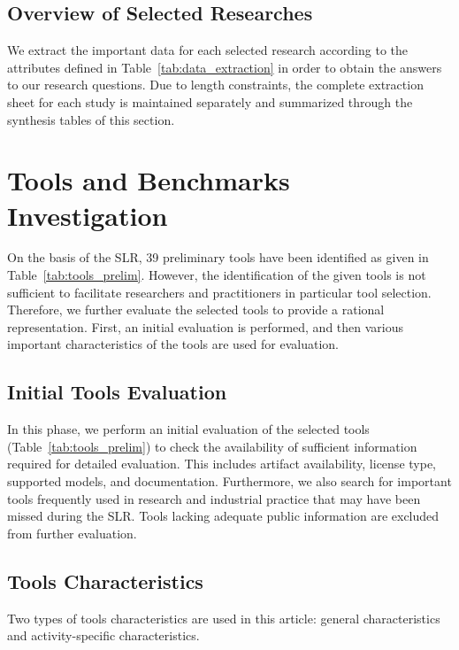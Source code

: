 \documentclass[10pt,a4paper]{article}
\begin{document}
\subsection{Overview of Selected Researches}
\label{sec:overview_researches}
We extract the important data for each selected research according to the attributes defined in Table~\ref{tab:data_extraction} in order to obtain the answers to our research questions. Due to length constraints, the complete extraction sheet for each study is maintained separately and summarized through the synthesis tables of this section.

\section{Tools and Benchmarks Investigation}
\label{sec:tools_investigation}
On the basis of the SLR, 39 preliminary tools have been identified as given in Table~\ref{tab:tools_prelim}. However, the identification of the given tools is not sufficient to facilitate researchers and practitioners in particular tool selection. Therefore, we further evaluate the selected tools to provide a rational representation. First, an initial evaluation is performed, and then various important characteristics of the tools are used for evaluation.

\subsection{Initial Tools Evaluation}
\label{sec:initial_eval}
In this phase, we perform an initial evaluation of the selected tools (Table~\ref{tab:tools_prelim}) to check the availability of sufficient information required for detailed evaluation. This includes artifact availability, license type, supported models, and documentation. Furthermore, we also search for important tools frequently used in research and industrial practice that may have been missed during the SLR. Tools lacking adequate public information are excluded from further evaluation.

\subsection{Tools Characteristics}
\label{sec:char_defined}
Two types of tools characteristics are used in this article: general characteristics and activity-specific characteristics.
\end{document}
